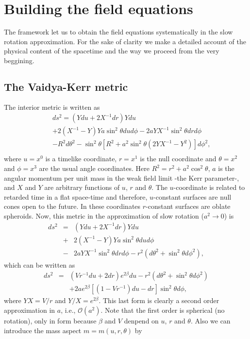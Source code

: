 \documentclass[twocolumn,superscriptaddress]{revtex4}
\begin{document}
\section{Building the field equations}
The framework let us to obtain the field equations systematically in the slow rotation approximation. For the sake of clarity we make a detailed account of the physical content of the spacetime and the way we proceed from the very beggining.
\subsection{The Vaidya-Kerr metric}
The interior metric is written as \cite{HerreraJimenez1982} 
\begin{eqnarray}
&&ds^2=(Ydu+2X^{-1}dr)Ydu\nonumber\\
&&+2\left(X^{-1}-Y\right)Ya\sin ^2\theta
dud\phi -2aYX^{-1}\sin ^2\theta drd\phi \nonumber \\
&&-R^2d\theta ^2-\sin ^2\theta \left[ R^2 +a^2\sin ^2\theta
\left( 2YX^{-1}-{Y^2}\right) \right] d\phi^2,\nonumber \\
 \label{metricin0}
\end{eqnarray}
where $u=x^0$ is a timelike coordinate, $r=x^1$ is the null coordinate and $%
\theta =x^2$ and $\phi =x^3$ are the usual angle coordinates. Here $%
R^2=r^2+a^2\cos ^2\theta $, $a$ is the angular momentum per unit mass in the weak field limit -the Kerr parameter-, and $X$ and $Y$ are arbitrary functions of $u$, $r$ and $\theta $. The $u$-coordinate is related to retarded time in a flat space-time and therefore, $u$-constant surfaces are null cones open to the future. In these coordinates $r$-constant surfaces are oblate spheroids.
Now, this metric in the approximation of slow rotation ($a^2\rightarrow 0$) is
\begin{eqnarray}
ds^2&=&(Ydu+2X^{-1}dr)Ydu \nonumber\\
&+&2\left(X^{-1}-Y\right)Ya\sin ^2\theta dud\phi \nonumber\\
&-&2aYX^{-1}\sin ^2\theta drd\phi-r^2(d\theta ^2+\sin ^2\theta d\phi^2) ,  \label{metricin1}
\end{eqnarray}
which can be written as
\begin{eqnarray}
ds^2&=&(Vr^{-1}du+2dr)e^{2\beta}du-r^2(d\theta^2+\sin ^2\theta d\phi^2)\nonumber \\
&&+2ae^{2\beta}\left[(1-Vr^{-1}) du -dr\right]\sin ^2\theta d\phi,  \label{metricin2}
\end{eqnarray}
where $YX=V/r$ and $Y/X=e^{2\beta}$. This last form is clearly a second order approximation in $a$, i.e., $\mathcal{O}(a^2)$. Note that the first order is spherical (no rotation), only in form because $\beta$ and $V$ denpend on $u$, $r$ and $\theta$. Also we can introduce the mass aspect $m=m(u,r,\theta)$ by
\end{document}
